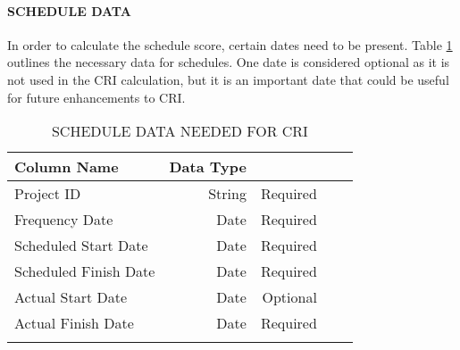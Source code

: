 \documentclass[SDSUThesis.tex]{subfiles}
\begin{document}
            \paragraph{SCHEDULE DATA}
            
                In order to calculate the schedule score, certain dates
                need to be present. Table \ref{tab:scheduledata} outlines
                the necessary data for schedules.  One date is considered
                optional as it is not used in the CRI calculation, but it
                is an important date that could be useful for future
                enhancements to CRI.
            
                \begin{longtable}{@{}l rr rr}
                    \toprule%
                     \centering%
                     {\bfseries Column Name}
                     & {\bfseries Data Type}
                     &  \\
                    
                    \cmidrule[0.4pt](r{0.125em}){1-1}%
                    \cmidrule[0.4pt](lr{0.125em}){2-2}%
                    \cmidrule[0.4pt](l{0.125em}){3-3}%
                    \endhead
                    
                    Project ID & String  & Required \\
                    \myrowcolour%
                    Frequency Date & Date & Required \\
                    Scheduled Start Date & Date & Required \\
                    \myrowcolour%
                    Scheduled Finish Date & Date & Required \\
                    Actual Start Date & Date  & Optional \\
                    \myrowcolour%
                    Actual Finish Date & Date  & Required \\
                    
                    \bottomrule
                    
                    \caption{SCHEDULE DATA NEEDED FOR CRI}
                    \label{tab:scheduledata}
                \end{longtable}
                    
\end{document}
